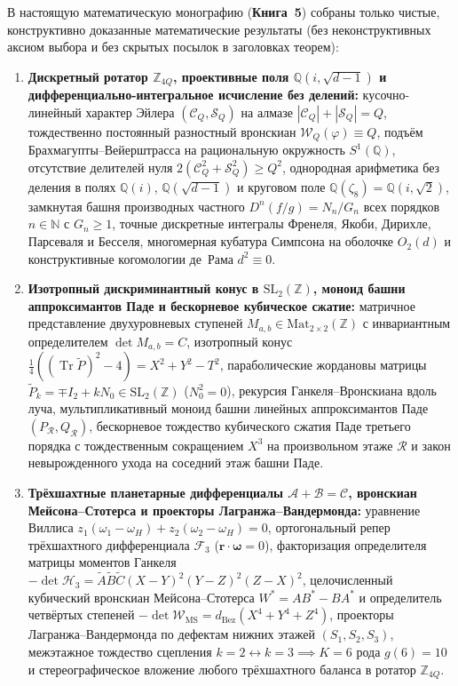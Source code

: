 В настоящую математическую монографию (\textbf{Книга~5}) собраны только чистые, конструктивно доказанные математические результаты (без неконструктивных аксиом выбора и без скрытых посылок в заголовках теорем):
\begin{enumerate}[label=\textbf{Глава \arabic*.},leftmargin=*]
\item \textbf{Дискретный ротатор $\mathbb{Z}_{4Q}$, проективные поля $\mathbb{Q}(i, \sqrt{d-1})$ и дифференциально-интегральное исчисление без делений:}
  кусочно-линейный характер Эйлера $(\mathcal{C}_Q, \mathcal{S}_Q)$ на алмазе $|\mathcal{C}_Q|+|\mathcal{S}_Q|=Q$, тождественно постоянный разностный вронскиан $\mathcal{W}_Q(\varphi)\equiv Q$, подъём Брахмагупты--Вейерштрасса на рациональную окружность $S^1(\mathbb{Q})$, отсутствие делителей нуля $2(\mathcal{C}_Q^2+\mathcal{S}_Q^2)\ge Q^2$, однородная арифметика без деления в полях $\mathbb{Q}(i)$, $\mathbb{Q}(\sqrt{d-1})$ и круговом поле $\mathbb{Q}(\zeta_8) = \mathbb{Q}(i,\sqrt{2})$, замкнутая башня производных частного $D^n(f/g) = N_n/G_n$ всех порядков $n\in\mathbb{N}$ с $G_n \ge 1$, точные дискретные интегралы Френеля, Якоби, Дирихле, Парсеваля и Бесселя, многомерная кубатура Симпсона на оболочке $O_2(d)$ и конструктивные когомологии де~Рама $d^2\equiv 0$.
\item \textbf{Изотропный дискриминантный конус в $\mathrm{SL}_2(\mathbb{Z})$, моноид башни аппроксимантов Паде и бескорневое кубическое сжатие:}
  матричное представление двухуровневых ступеней $M_{a,b}\in\mathrm{Mat}_{2\times 2}(\mathbb{Z})$ с инвариантным определителем $\det M_{a,b} = C$, изотропный конус $\frac{1}{4}((\operatorname{Tr}\widetilde{P})^2 - 4) = X^2 + Y^2 - T^2$, параболические жордановы матрицы $\widetilde{P}_k = \mp I_2 + k N_0 \in \mathrm{SL}_2(\mathbb{Z})$ ($N_0^2 = 0$), рекурсия Ганкеля--Вронскиана вдоль луча, мультипликативный моноид башни линейных аппроксимантов Паде $(P_{\mathcal{R}}, Q_{\mathcal{R}})$, бескорневое тождество кубического сжатия Паде третьего порядка с тождественным сокращением $X^3$ на произвольном этаже $\mathcal{R}$ и закон невырожденного ухода на соседний этаж башни Паде.
\item \textbf{Трёхшахтные планетарные дифференциалы $\mathcal{A} + \mathcal{B} = \mathcal{C}$, вронскиан Мейсона--Стотерса и проекторы Лагранжа--Вандермонда:}
  уравнение Виллиса $z_1(\omega_1-\omega_H)+z_2(\omega_2-\omega_H)=0$, ортогональный репер трёхшахтного дифференциала $\mathcal{F}_3$ ($\mathbf{r}\cdot\mathbf{\omega}=0$), факторизация определителя матрицы моментов Ганкеля $-\det\mathcal{H}_3 = \widetilde{A}\widetilde{B}\widetilde{C}(X-Y)^2(Y-Z)^2(Z-X)^2$, целочисленный кубический вронскиан Мейсона--Стотерса $W^* = A B^* - B A^*$ и определитель четвёртых степеней $-\det\mathcal{W}_{\mathrm{MS}} = d_{\mathrm{Bez}}(X^4+Y^4+Z^4)$, проекторы Лагранжа--Вандермонда по дефектам нижних этажей $(S_1, S_2, S_3)$, межэтажное тождество сцепления $k=2 \leftrightarrow k=3 \implies K=6$ рода $g(6)=10$ и стереографическое вложение любого трёхшахтного баланса в ротатор $\mathbb{Z}_{4Q}$.

\end{enumerate}
